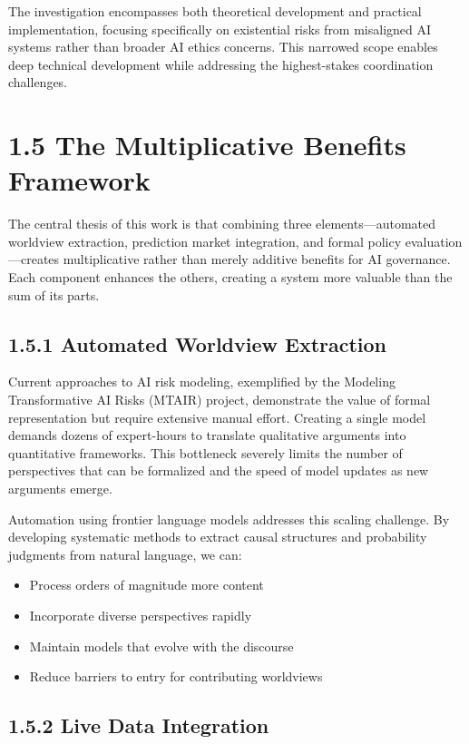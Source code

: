 \documentclass[
  11pt,
  letterpaper,
]{book}
\providecommand{\tightlist}{%
  \setlength{\itemsep}{0pt}\setlength{\parskip}{0pt}}
\begin{document}
The investigation encompasses both theoretical development and practical
implementation, focusing specifically on existential risks from
misaligned AI systems rather than broader AI ethics concerns. This
narrowed scope enables deep technical development while addressing the
highest-stakes coordination challenges.

\section{1.5 The Multiplicative Benefits
Framework}\label{the-multiplicative-benefits-framework}

The central thesis of this work is that combining three
elements---automated worldview extraction, prediction market
integration, and formal policy evaluation---creates multiplicative
rather than merely additive benefits for AI governance. Each component
enhances the others, creating a system more valuable than the sum of its
parts.

\subsection{1.5.1 Automated Worldview
Extraction}\label{automated-worldview-extraction}

Current approaches to AI risk modeling, exemplified by the Modeling
Transformative AI Risks (MTAIR) project, demonstrate the value of formal
representation but require extensive manual effort. Creating a single
model demands dozens of expert-hours to translate qualitative arguments
into quantitative frameworks. This bottleneck severely limits the number
of perspectives that can be formalized and the speed of model updates as
new arguments emerge.

Automation using frontier language models addresses this scaling
challenge. By developing systematic methods to extract causal structures
and probability judgments from natural language, we can:

\begin{itemize}
\tightlist
\item
  Process orders of magnitude more content
\item
  Incorporate diverse perspectives rapidly
\item
  Maintain models that evolve with the discourse
\item
  Reduce barriers to entry for contributing worldviews
\end{itemize}

\subsection{1.5.2 Live Data Integration}\label{live-data-integration}
\end{document}
